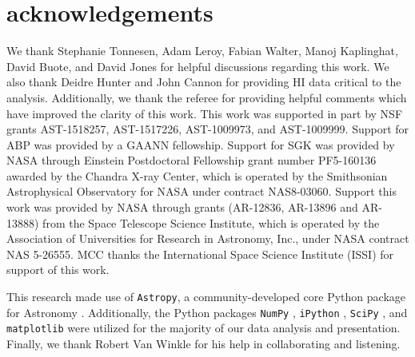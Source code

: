 \documentclass[usenatbib]{mn2e}
\begin{document}
\section*{acknowledgements}
We thank Stephanie Tonnesen, Adam Leroy, Fabian Walter, Manoj
Kaplinghat, David Buote, and David Jones for helpful discussions
regarding this work. We also thank Deidre Hunter and John Cannon for
providing H{\scriptsize I} data critical to the analysis.
Additionally, we thank the referee for providing helpful comments
which have improved the clarity of this work.
%
This work was supported in part by NSF grants AST-1518257,
AST-1517226, AST-1009973, and AST-1009999.
%
Support for ABP was provided by a GAANN fellowship. Support for SGK
was provided by NASA through Einstein Postdoctoral Fellowship grant
number PF5-160136 awarded by the Chandra X-ray Center, which is
operated by the Smithsonian Astrophysical Observatory for NASA under
contract NAS8-03060.
%
Support this work was provided by NASA through grants (AR-12836,
AR-13896 and AR-13888) from the Space Telescope Science Institute,
which is operated by the Association of Universities for Research in
Astronomy, Inc., under NASA contract NAS 5-26555.
%
MCC thanks the International Space Science Institute (ISSI) for
support of this work. 


This research made use of {\texttt{Astropy}}, a community-developed
core Python package for Astronomy \citep{astropy13}. Additionally, the
Python packages {\texttt{NumPy}} \citep{numpy}, {\texttt{iPython}}
\citep{ipython}, {\texttt{SciPy}} \citep{scipy}, and
{\texttt{matplotlib}} \citep{matplotlib} were utilized for the
majority of our data analysis and presentation. Finally, we thank
Robert Van Winkle for his help in collaborating and listening.





\label{lastpage}
\end{document}
